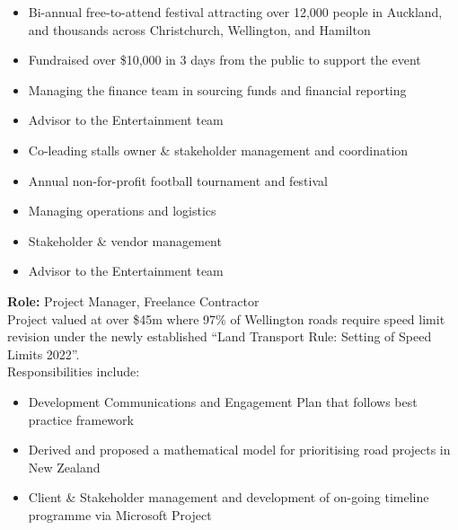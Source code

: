 \documentclass[10pt,a4paper,ragged2e,withhyper]{altacv}
\begin{document}
\newpage


\begin{itemize}
\item Bi-annual free-to-attend festival attracting over 12,000 people in Auckland, and thousands across Christchurch, Wellington, and Hamilton 
\item Fundraised over \$10,000 in 3 days from the public to support the event
\item Managing the finance team in sourcing funds and financial reporting
\item Advisor to the Entertainment team
\item Co-leading stalls owner \& stakeholder management and coordination 
\end{itemize}

\divider

\begin{itemize}
\item Annual non-for-profit football tournament and festival  
\item Managing operations and logistics
\item Stakeholder \& vendor management
\item Advisor to the Entertainment team
\end{itemize}

\medskip


\textbf{Role:} Project Manager, Freelance Contractor\\
Project valued at over \$45m where 97\% of Wellington roads require speed limit revision under the newly established ``Land Transport Rule: Setting of Speed Limits 2022''. \\
Responsibilities include:
\begin{itemize}
\item Development Communications and Engagement Plan that follows best practice framework
\item Derived and proposed a mathematical model for prioritising road projects in New Zealand 
\item Client \& Stakeholder management and development of on-going timeline programme via Microsoft Project 
\end{itemize}
\end{document}
